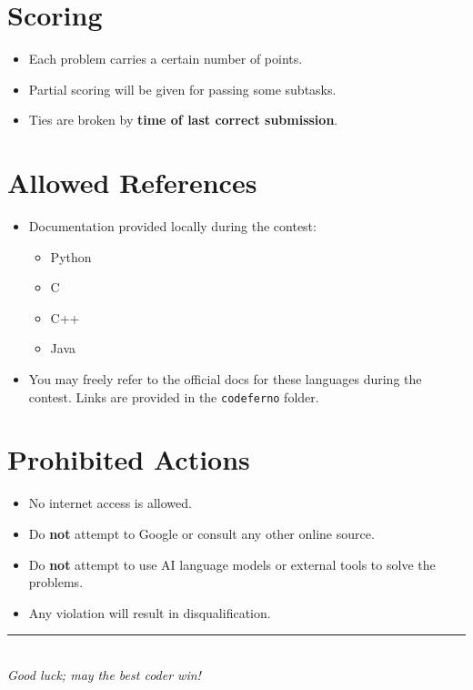 \documentclass[12pt,a4paper]{article}
\begin{document}
\section*{Scoring}
\begin{itemize}[leftmargin=1.5em]
    \item Each problem carries a certain number of points.  
    \item Partial scoring will be given for passing some subtasks.  
    \item Ties are broken by \textbf{time of last correct submission}.  
\end{itemize}

\section*{Allowed References}
\begin{itemize}[leftmargin=1.5em]
    \item Documentation provided locally during the contest:  
    \begin{itemize}
        \item Python
        \item C
        \item C++
        \item Java
    \end{itemize}
    \item You may freely refer to the official docs for these languages during the contest. Links are provided in the \texttt{codeferno} folder. 
\end{itemize}

\section*{Prohibited Actions}
\begin{itemize}[leftmargin=1.5em]
    \item No internet access is allowed.  
    \item Do \textbf{not} attempt to Google or consult any other online source.  
    \item Do \textbf{not} attempt to use AI language models or external tools to solve the problems.  
    \item Any violation will result in disqualification.  
\end{itemize}

\vfill
\begin{center}
    \rule{0.8\textwidth}{0.4pt} \\[0.5em]
    \textit{Good luck; may the best coder win!}
\end{center}
\end{document}

